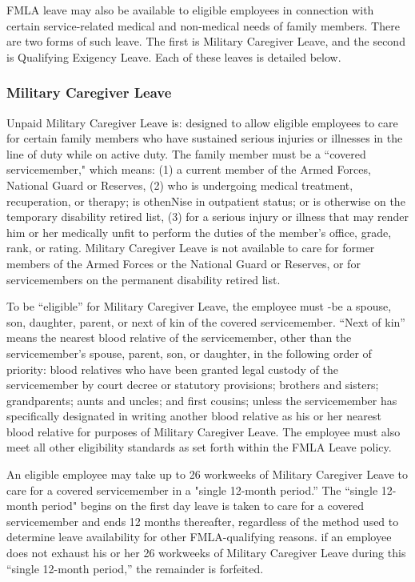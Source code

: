 FMLA leave may also be available to eligible employees in connection with certain service-related medical and non-medical needs of family members. There are two forms of such leave. The first is Military Caregiver Leave, and the second is Qualifying Exigency Leave. Each of these leaves is detailed below.

\subsubsection{Military Caregiver Leave}

Unpaid Military Caregiver Leave is: designed to allow eligible employees to care for certain family members who have sustained serious injuries or illnesses in the line of duty while on active duty. The family member must be a “covered servicemember," which means: (1) a current member of the Armed Forces, National Guard or Reserves, (2) who is undergoing medical treatment, recuperation, or therapy; is othenNise in outpatient status; or is otherwise on the temporary disability retired list, (3) for a serious injury or illness that may render him or her medically unfit to perform the duties of the member's office, grade, rank, or rating. Military Caregiver Leave is not available to care for former members of the Armed Forces or the National Guard or Reserves, or for servicemembers on the permanent disability retired list.

To be “eligible” for Military Caregiver Leave, the employee must -be a spouse, son, daughter, parent, or next of kin of the covered servicemember. “Next of kin” means the nearest blood relative of the servicemember, other than the servicemember’s spouse, parent, son, or daughter, in the following order of priority: blood relatives who have been granted legal custody of the servicemember by court decree or statutory provisions; brothers and sisters; grandparents; aunts and uncles; and first cousins; unless the servicemember has specifically designated in writing another blood relative as his or her nearest blood relative for purposes of Military Caregiver Leave. The employee must also meet all other eligibility standards as set forth within the FMLA Leave policy.

An eligible employee may take up to 26 workweeks of Military Caregiver Leave to care for a covered servicemember in a "single 12-month period.” The “single 12-month period" begins on the first day leave is taken to care for a covered servicemember and ends 12 months thereafter, regardless of the method used to determine leave availability for other FMLA-qualifying reasons. if an employee does not exhaust his or her 26 workweeks of Military Caregiver Leave during this “single 12-month period,” the remainder is forfeited.

